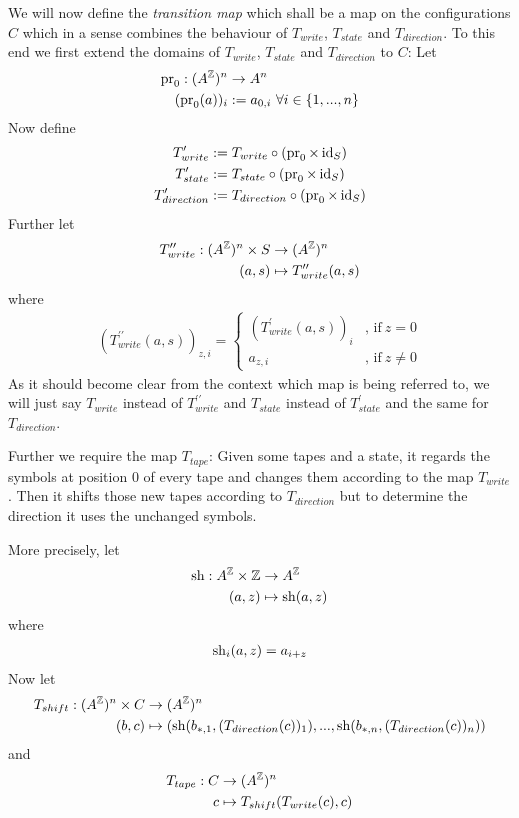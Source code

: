 We will now define the \emph{transition map} which shall be a map on the configurations $C$ which in a sense combines the behaviour of $T_{write}$, $T_{state}$ and $T_{direction}$.
To this end we first extend the domains of $T_{write}$, $T_{state}$ and $T_{direction}$ to $C$:
Let
\begin{align*}
	\operatorname{pr}_0: (A^{\mathbb{Z}})^n &\to A^n \\
	(\operatorname{pr}_0(a))_i &:= a_{0,i}~\forall i \in \{1,...,n\}
\end{align*}
Now define
\begin{align*}
	T_{write}^\prime &:= T_{write} \circ (\operatorname{pr}_0 \times \operatorname{id}_S) \\
	T_{state}^\prime &:= T_{state} \circ (\operatorname{pr}_0 \times \operatorname{id}_S) \\
	T_{direction}^\prime &:= T_{direction} \circ (\operatorname{pr}_0 \times \operatorname{id}_S)
\end{align*}
Further let
\begin{align*}
	T_{write}^{\prime\prime}: (A^{\mathbb{Z}})^n \times S &\to (A^{\mathbb{Z}})^n \\
	(a,s) &\mapsto T_{write}^{\prime\prime}(a,s) \\
\end{align*}
where
\begin{align*}
	(T_{write}^{\prime\prime}(a,s))_{z,i} =
	\begin{cases}
		(T_{write}^\prime(a,s))_i &\text{, if}~z = 0 \\
		a_{z,i} &\text{, if}~z \neq 0
	\end{cases}
\end{align*}
As it should become clear from the context which map is being referred to, we will just say $T_{write}$ instead of $T_{write}^{\prime\prime}$
and $T_{state}$ instead of $T_{state}^{\prime}$
and the same for $T_{direction}$.

Further we require the map $T_{tape}$:
Given some tapes and a state, it regards the symbols at position 0 of every tape and changes them according to the map $T_{write}$.
Then it shifts those new tapes according to $T_{direction}$ but to determine the direction it uses the unchanged symbols.

More precisely, let
\begin{align*}
	\operatorname{sh}: A^{\mathbb{Z}} \times \mathbb{Z} &\to A^{\mathbb{Z}} \\
	(a,z) &\mapsto \operatorname{sh}(a,z)
\end{align*}
where
\begin{align*}
	\operatorname{sh}_i(a,z) = a_{i+z}
\end{align*}
Now let
\begin{align*}
	T_{shift}: (A^{\mathbb{Z}})^n \times C &\to (A^{\mathbb{Z}})^n \\
	(b,c) &\mapsto ( \operatorname{sh}(b_{*,1},(T_{direction}(c))_1) , ... , \operatorname{sh}(b_{*,n},(T_{direction}(c))_n) )
\end{align*}
and
\begin{align*}
	T_{tape}: C &\to (A^{\mathbb{Z}})^n \\
	c &\mapsto T_{shift} (T_{write} (c) , c)
\end{align*}

